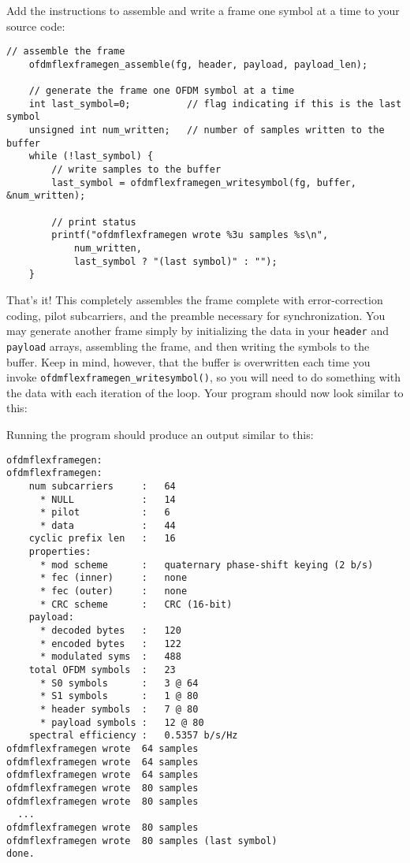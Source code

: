 Add the instructions to assemble and write a frame one symbol at a time
to your source code:
%
\begin{Verbatim}[fontsize=\small]
    // assemble the frame
    ofdmflexframegen_assemble(fg, header, payload, payload_len);

    // generate the frame one OFDM symbol at a time
    int last_symbol=0;          // flag indicating if this is the last symbol
    unsigned int num_written;   // number of samples written to the buffer
    while (!last_symbol) {
        // write samples to the buffer
        last_symbol = ofdmflexframegen_writesymbol(fg, buffer, &num_written);

        // print status
        printf("ofdmflexframegen wrote %3u samples %s\n",
            num_written,
            last_symbol ? "(last symbol)" : "");
    }
\end{Verbatim}
%
That's it!
This completely assembles the frame complete with error-correction
coding, pilot subcarriers, and the preamble necessary for
synchronization.
You may generate another frame simply by
  initializing the data in your {\tt header} and {\tt payload} arrays,
  assembling the frame,
  and then writing the symbols to the buffer.
Keep in mind, however, that the buffer is overwritten each time you
invoke {\tt ofdmflexframegen\_writesymbol()},
so you will need to do something with the data with each iteration of
the loop.
%
Your program should now look similar to this:
%

%
Running the program should produce an output similar to this:
%
\begin{Verbatim}[fontsize=\small]
ofdmflexframegen:
ofdmflexframegen:
    num subcarriers     :   64
      * NULL            :   14
      * pilot           :   6
      * data            :   44
    cyclic prefix len   :   16
    properties:
      * mod scheme      :   quaternary phase-shift keying (2 b/s)
      * fec (inner)     :   none
      * fec (outer)     :   none
      * CRC scheme      :   CRC (16-bit)
    payload:
      * decoded bytes   :   120
      * encoded bytes   :   122
      * modulated syms  :   488
    total OFDM symbols  :   23
      * S0 symbols      :   3 @ 64
      * S1 symbols      :   1 @ 80
      * header symbols  :   7 @ 80
      * payload symbols :   12 @ 80
    spectral efficiency :   0.5357 b/s/Hz
ofdmflexframegen wrote  64 samples 
ofdmflexframegen wrote  64 samples 
ofdmflexframegen wrote  64 samples 
ofdmflexframegen wrote  80 samples 
ofdmflexframegen wrote  80 samples 
  ...
ofdmflexframegen wrote  80 samples 
ofdmflexframegen wrote  80 samples (last symbol)
done.
\end{Verbatim}
